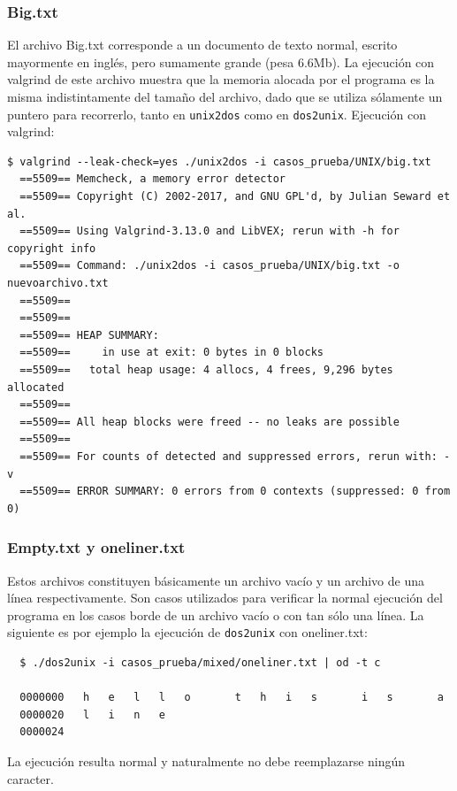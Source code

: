 \documentclass[a4paper,10pt, spanish]{article}
\begin{document}
\subsubsection{Big.txt}
El archivo Big.txt corresponde a un documento de texto normal, escrito mayormente en inglés, pero sumamente
grande (pesa 6.6Mb).
La ejecución con valgrind de este archivo muestra que la memoria alocada por el programa es la misma
indistintamente del tamaño del archivo, dado que se utiliza sólamente un puntero para recorrerlo, tanto en
\lstinline{unix2dos} como en \lstinline{dos2unix}.
Ejecución con valgrind:
\begin{lstlisting}
$ valgrind --leak-check=yes ./unix2dos -i casos_prueba/UNIX/big.txt
  ==5509== Memcheck, a memory error detector
  ==5509== Copyright (C) 2002-2017, and GNU GPL'd, by Julian Seward et al.
  ==5509== Using Valgrind-3.13.0 and LibVEX; rerun with -h for copyright info
  ==5509== Command: ./unix2dos -i casos_prueba/UNIX/big.txt -o nuevoarchivo.txt
  ==5509== 
  ==5509== 
  ==5509== HEAP SUMMARY:
  ==5509==     in use at exit: 0 bytes in 0 blocks
  ==5509==   total heap usage: 4 allocs, 4 frees, 9,296 bytes allocated
  ==5509== 
  ==5509== All heap blocks were freed -- no leaks are possible
  ==5509== 
  ==5509== For counts of detected and suppressed errors, rerun with: -v
  ==5509== ERROR SUMMARY: 0 errors from 0 contexts (suppressed: 0 from 0)  
\end{lstlisting}
\subsubsection{Empty.txt y oneliner.txt}
Estos archivos constituyen básicamente un archivo vacío y un archivo de una línea respectivamente.
Son casos utilizados para verificar la normal ejecución del programa en los casos borde de un archivo
vacío o con tan sólo una línea.
La siguiente es por ejemplo la ejecución de \lstinline{dos2unix} con oneliner.txt:
\begin{lstlisting}
  $ ./dos2unix -i casos_prueba/mixed/oneliner.txt | od -t c
  
  0000000   h   e   l   l   o       t   h   i   s       i   s       a    
  0000020   l   i   n   e
  0000024    
\end{lstlisting}
La ejecución resulta normal y naturalmente no debe reemplazarse ningún caracter.
\end{document}
